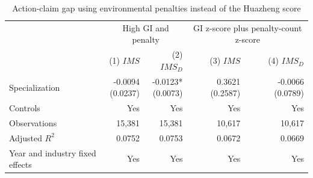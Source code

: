 \begin{table}[H]
    \centering
    \caption{Action-claim gap using environmental penalties instead of the Huazheng score}
    \label{tab:penalty_gap}
    \begin{tabular}{lrrrr}
        \toprule
        & \multicolumn{2}{c}{High GI and penalty} & \multicolumn{2}{c}{GI z-score plus penalty-count z-score} \\
        \cmidrule(lr){2-3} \cmidrule(lr){4-5}
        & (1) \(IMS\) & (2) \(IMS_D\) & (3) \(IMS\) & (4) \(IMS_D\) \\
        \midrule
        Specialization & \shortstack{-0.0094 \\ (0.0237)} & \shortstack{-0.0123* \\ (0.0073)} & \shortstack{0.3621 \\ (0.2587)} & \shortstack{-0.0066 \\ (0.0789)} \\
        Controls & Yes & Yes & Yes & Yes \\
        Observations & 15,381 & 15,381 & 10,617 & 10,617 \\
        Adjusted $R^2$ & 0.0752 & 0.0753 & 0.0672 & 0.0669 \\
        Year and industry fixed effects & Yes & Yes & Yes & Yes \\
        \bottomrule
    \end{tabular}
\end{table}
